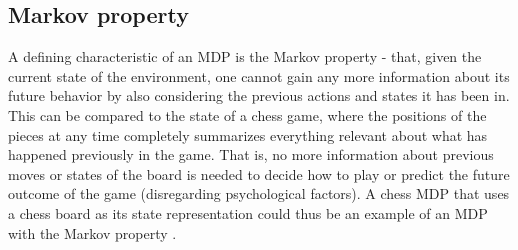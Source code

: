 \subsection{Markov property}

A defining characteristic of an MDP is the Markov property - that, given the current state of the environment, one cannot gain any more information about its future behavior by also considering the previous actions and states it has been in. This can be compared to the state of a chess game, where the positions of the pieces at any time completely summarizes everything relevant about what has happened previously in the game. That is, no more information about previous moves or states of the board is needed to decide how to play or predict the future outcome of the game (disregarding psychological factors). A chess MDP that uses a chess board as its state representation could thus be an example of an MDP with the Markov property \parencite{altman2002applications}. 